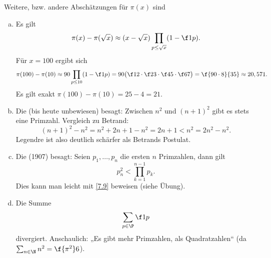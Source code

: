 \begin{nt} \label{7.10}
	Weitere, bzw. andere Abschätzungen für $\pi(x)$ sind
	\begin{enumerate}[a)]
		\item
			Es gilt
			\[
				\pi(x) - \pi(\sqrt x) \approx (x-\sqrt x)\prod_{p \le \sqrt x} (1 - \f 1p).
			\]
			Für $x = 100$ ergibt sich
			\[
				\pi(100) - \pi(10)
				\approx 90 \prod_{p \le 10} (1 - \f 1p)
				= 90 \big( \f 12 \cdot \f 23 \cdot \f 45 \cdot \f 67 \big)
				= \f{90 \cdot 8}{35}
				\approx 20,571.
			\]
			Es gilt exakt $\pi(100) - \pi(10) = 25 - 4 = 21$.
		\item
			Die  (bis heute unbewiesen) besagt:
			Zwischen $n^2$ und $(n+1)^2$ gibt es stets eine Primzahl.
			Vergleich zu Betrand:
			\[
				(n+1)^2 - n^2
				= n^2 + 2n + 1 - n^2
				= 2n + 1
				< n^2 = 2n^2 - n^2.
			\]
			Legendre ist also deutlich schärfer als Betrands Postulat.
		\item
			Die  (1907) besagt:
			Seien $p_1, \dotsc, p_n$ die ersten $n$ Primzahlen, dann gilt
			\[
				p_n^2 < \prod_{k=1}^{n-1} p_k.
			\]
			Dies kann man leicht mit \ref{7.9} beweisen (siehe Übung).
		\item
			Die Summe
			\[
				\sum_{p\in\P} \f 1p
			\]
			divergiert.
			Anschaulich: „Es gibt mehr Primzahlen, als Quadratzahlen“ (da $\sum_{n \in \N} n^2 = \f{\pi^2}6$).
	\end{enumerate}
\end{nt}

